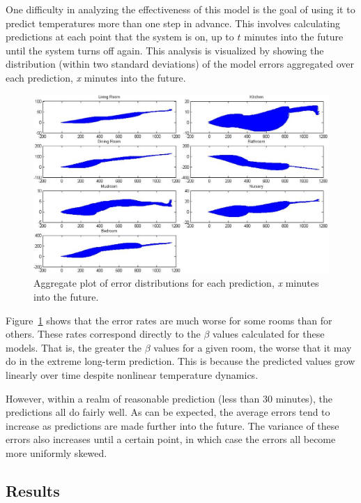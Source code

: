 One difficulty in analyzing the effectiveness of this model is the goal of using
it to predict temperatures more than one step in advance.  This involves
calculating predictions at each point that the system is on, up to $t$ minutes
into the future until the system turns off again. This analysis is visualized by
showing the distribution (within two standard deviations) of the model errors
aggregated over each prediction, {\em x} minutes into the future.

\begin{figure}
\begin{center}
\includegraphics[width=0.8\columnwidth]{fig/errorDist.eps}
\end{center}
\caption[Aggregate plot of error distribution]{Aggregate plot of error
distributions for each prediction, {\em x} minutes into the future.}
\label{fig:errorDist}
\end{figure}

Figure~\ref{fig:errorDist} shows that the error rates are much worse for some
rooms than for others. These rates correspond directly to the $\beta$ values
calculated for these models. That is, the greater the $\beta$ values for a given
room, the worse that it may do in the extreme long-term prediction. This is
because the predicted values grow linearly over time despite nonlinear
temperature dynamics.

However, within a realm of reasonable prediction (less than 30 minutes), the
predictions all do fairly well. As can be expected, the average errors tend to
increase as predictions are made further into the future. The variance of these
errors also increases until a certain point, in which case the errors all become
more uniformly skewed.

\subsection{Results}
\label{sec:thermalResults}

